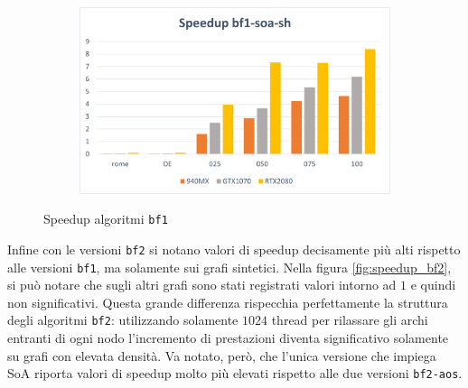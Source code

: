 \documentclass[12pt,a4paper,oneside]{book}
\begin{document}
\begin{figure}[b]
\begin{subfigure}{.5\textwidth}
		\end{subfigure}%
		\begin{subfigure}{.5\textwidth}
			\centering
			\includegraphics[width=\textwidth]{speedup_bf1-soa-sh}
		\end{subfigure}
		\caption{Speedup algoritmi \texttt{bf1}}
		\label{fig:speedup_bf1}
	\end{figure}

	Infine con le versioni \texttt{bf2} si notano valori di speedup decisamente più alti rispetto alle versioni \texttt{bf1}, ma solamente sui grafi sintetici. Nella figura \ref{fig:speedup_bf2}, si può notare che sugli altri grafi sono stati registrati valori intorno ad $1$ e quindi non significativi. Questa grande differenza rispecchia perfettamente la struttura degli algoritmi \texttt{bf2}: utilizzando solamente $1024$ thread per rilassare gli archi entranti di ogni nodo l'incremento di prestazioni diventa significativo solamente su grafi con elevata densità. Va notato, però, che l'unica versione che impiega SoA riporta valori di speedup molto più elevati rispetto alle due versioni \texttt{bf2-aos}.
\end{document}
